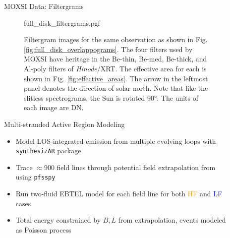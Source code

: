 \documentclass[final]{beamer}
\newlength{\sepwidth}
\newlength{\colwidth}
\newcommand{\separatorcolumn}{\begin{column}{\sepwidth}\end{column}}
\begin{document}
\begin{frame}[t]
\begin{columns}[t]
\begin{column}{\colwidth}
\end{column}

\separatorcolumn

\begin{column}{\colwidth}

  \begin{block}{MOXSI Data: Filtergrams}

    \begin{figure}
      \centering
      {full_disk_filtergrams.pgf}
      \caption{Filtergram images for the same observation as shown in Fig. \ref{fig:full_disk_overlappograms}. The four filters used by MOXSI have heritage in the Be-thin, Be-med, Be-thick, and Al-poly filters of \textit{Hinode}/XRT. The effective area for each is shown in Fig. \ref{fig:effective_areas}. The arrow in the leftmost panel denotes the direction of solar north. Note that like the slitless spectrograms, the Sun is rotated \ang{90}. The units of each image are DN.}
      \label{fig:full_disk_filtergrams}
    \end{figure}

  \end{block}

  \vspace{-30px}

  \begin{block}{Multi-stranded Active Region Modeling}

    \begin{itemize}
      \item Model \alert{LOS-integrated emission from multiple evolving loops} with \texttt{synthesizAR} package \citep{barnes_understanding_2019}
      \item Trace $\approx900$ field lines through potential field extrapolation from using \texttt{pfsspy} \citep{stansby_pfsspy_2020}
      \item \alert{Run two-fluid EBTEL model \citep{klimchuk_highly_2008,barnes_inference_2016} for each field line} for both \textcolor{orange}{HF} and \textcolor{blue}{LF} cases
      \item Total energy constrained by $B,L$ from extrapolation, events modeled as Poisson process \citep{warren_observation_2020}
    \end{itemize}


\end{block}
\end{column}
\end{columns}
\end{frame}
\end{document}
